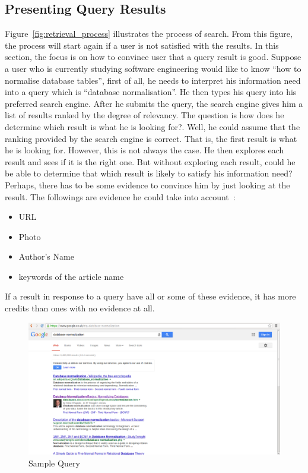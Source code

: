 \subsection{Presenting Query Results}\label{sec:presentingQueryResult}
Figure~\ref{fig:retrieval_process} illustrates the process of search. From this figure, the process will start again if a user is not satisfied with 
the results. In this section, the focus is on how to convince user that a query result is good. Suppose a user who is currently studying software engineering
would like to know ``how to normalise database tables'', first of all, he needs to interpret his information need into a query which is ``database normalisation''.
He then types his query into his preferred search engine. After he submits the query, the search engine gives him a list of results ranked by the degree
of relevancy. The question is how does he determine which result is what he is looking for?. Well, he could assume that the ranking provided by the search 
engine is correct. That is, the first result is what he is looking for. However, this is not always the case. He then explores each result and sees if 
it is the right one. But without exploring each result, could he be able to determine that which result is likely to satisfy his information need?
Perhaps, there has to be some evidence to convince him by just looking at the result. The followings are evidence he could take into account~\cite{craig}: 
\begin{itemize}
 \item URL
 \item Photo
 \item Author's Name
 \item keywords of the article name
\end{itemize}
If a result in response to a query have all or some of these evidence, it has more credits than ones with no evidence at all. 
\begin{figure}
\centering
\includegraphics[scale=0.3]{./figures/query.png}
\caption{Sample Query} \label{fig:query}
\end{figure}
